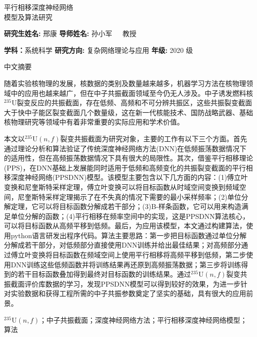 \begin{center}
{\erhao\heiti 平行相移深度神经网络\\\vspace{0.2cm}模型及算法研究}\\
\end{center}
\vspace{0.7cm}
\centerline{\normalsize{\songti\xiaosihao\textbf{\heiti 研究生姓名:}
\hspace{10pt}邢康}\hspace{20pt} \normalsize{ \songti\xiaosihao\textbf{\heiti 导师姓名:}
\hspace{10pt}孙小军~~~教授}}
\centerline{\normalsize{ \songti\textbf{\heiti 学科：}系统科学\quad}\normalsize{ \songti\textbf{\heiti 研究方向: }复杂网络理论与应用\quad}\normalsize{ \songti\textbf{\heiti 年级: } 2020 级} }
\vspace{0.5cm}
\centerline{\heiti\sanhao 中文摘要}
\vspace{0.1cm}
\par
随着实验核物理的发展，核数据的类别及数量越来越多，机器学习方法在核物理领域中的应用也越来越广，但在中子共振截面领域至今仍无人涉及。中子诱发燃料核$^{235}$U裂变反应的共振截面，存在低频、高频和不可分辨共振区，这些共振裂变截面大于快中子能区裂变截面几个数量级，这在新一代核能技术、国防战略武器、基础核物理研究等领域中有着非常重要的实际应用和学术价值。

本文以$^{235}\text{U}(n,f)$裂变共振截面为研究对象，主要的工作有以下三个方面。首先通过理论分析和算法验证了传统深度神经网络方法(DNN)在低频振荡数据情况下的适用性，但在高频振荡数据情况下具有很大的局限性。其次，借鉴平行相移理论(PPS)，在DNN基础上发展能同时适用于低频和高频变化的共振裂变截面的平行相移深度神经网络(PPSDNN)模型。该模型主要包含以下几方面的内容：(1)傅立叶变换和尼奎斯特采样定理，傅立叶变换可以将目标函数从时域空间变换到频域空间，尼奎斯特采样定理揭示了在不失真的情况下需要的最小采样频率；(2)单位分解定理，它可以将目标函数分解成若干部分；(3)B-样条函数，它可以用来构造满足单位分解的函数；(4)平行相移在频率空间中的实现，这是PPSDNN算法核心，可以将目标函数从高频平移到低频。最后，为应用该模型，本文通过构建算法，使用python语言研发出程序代码。算法主要思路：第一步把目标函数通过单位分解分解成若干部分，对低频部分直接使用DNN训练并给出最佳结果；对高频部分通过傅立叶变换将目标函数在频域空间上使用平行相移将高频平移到低频，第二步使用DNN训练这些低频函数并将训练结果再还原到高频振荡数据；第三步将训练得到的若干目标函数叠加得到最终对目标函数的训练结果。通过$^{235}\text{U}(n,f)$裂变共振截面评价库数据的学习，发现PPSDNN模型可以得到较好的效果，为进一步针对实验数据和获得工程所需的中子共振参数奠定了坚实的基础，具有很大的应用前景。
\par
\vspace{0.5cm}
$^{235}\text{U}(n,f)$；中子共振截面；深度神经网络方法；平行相移深度神经网络模型；算法